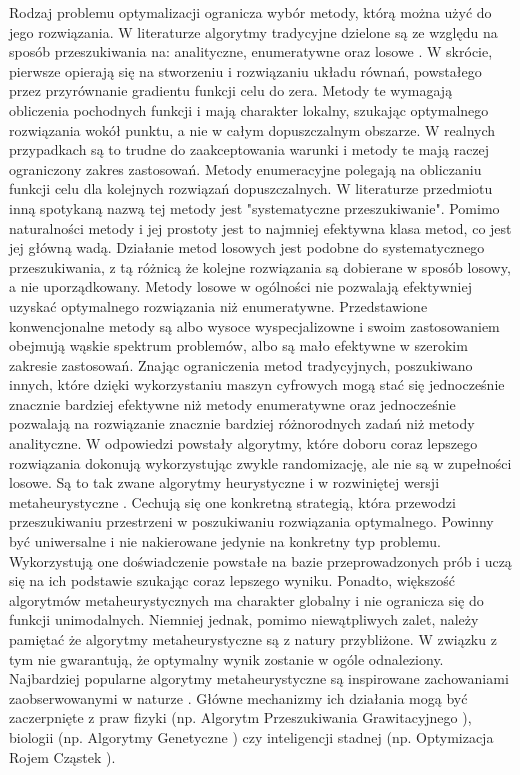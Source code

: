 Rodzaj problemu optymalizacji ogranicza wybór metody, którą można użyć do jego rozwiązania. W literaturze algorytmy tradycyjne dzielone są ze względu na sposób przeszukiwania na: analityczne, enumeratywne oraz losowe \parencite{Goldberg1995}. W skrócie, pierwsze opierają się na stworzeniu i rozwiązaniu układu równań, powstałego przez przyrównanie gradientu funkcji celu do zera. Metody te wymagają obliczenia pochodnych funkcji i mają charakter lokalny, szukając optymalnego rozwiązania wokół punktu, a nie w całym dopuszczalnym obszarze. W realnych przypadkach są to trudne do zaakceptowania warunki i metody te mają raczej ograniczony zakres zastosowań. Metody enumeracyjne polegają na obliczaniu funkcji celu dla kolejnych rozwiązań dopuszczalnych. W literaturze przedmiotu inną spotykaną nazwą tej metody jest "systematyczne przeszukiwanie". Pomimo naturalności metody i jej prostoty jest to najmniej efektywna klasa metod, co jest jej główną wadą. Działanie metod losowych jest podobne do systematycznego przeszukiwania, z tą różnicą że kolejne rozwiązania są dobierane w sposób losowy, a nie uporządkowany. Metody losowe w ogólności nie pozwalają efektywniej uzyskać optymalnego rozwiązania niż enumeratywne. Przedstawione konwencjonalne metody są albo wysoce wyspecjalizowne i swoim zastosowaniem obejmują wąskie spektrum problemów, albo są mało efektywne w szerokim zakresie zastosowań. Znając ograniczenia metod tradycyjnych, poszukiwano innych, które dzięki wykorzystaniu maszyn cyfrowych mogą stać się jednocześnie znacznie bardziej efektywne niż metody enumeratywne oraz jednocześnie pozwalają na rozwiązanie znacznie bardziej różnorodnych zadań niż metody analityczne. W odpowiedzi powstały algorytmy, które doboru coraz lepszego rozwiązania dokonują wykorzystując zwykle randomizację, ale nie są w zupełności losowe. Są to tak zwane algorytmy heurystyczne i w rozwiniętej wersji metaheurystyczne \parencite{Blum2003}. Cechują się one konkretną strategią, która przewodzi przeszukiwaniu przestrzeni w poszukiwaniu rozwiązania optymalnego. Powinny być uniwersalne i nie nakierowane jedynie na konkretny typ problemu. Wykorzystują one doświadczenie powstałe na bazie przeprowadzonych prób i uczą się na ich podstawie szukając coraz lepszego wyniku. Ponadto, większość algorytmów metaheurystycznych ma charakter globalny i nie ogranicza się do funkcji unimodalnych. Niemniej jednak, pomimo niewątpliwych zalet, należy pamiętać że algorytmy metaheurystyczne są z natury przybliżone. W związku z tym nie gwarantują, że optymalny wynik zostanie w ogóle odnaleziony. Najbardziej popularne algorytmy metaheurystyczne są inspirowane zachowaniami zaobserwowanymi w naturze \parencite{FisterJr.2013}. Główne mechanizmy ich działania mogą być zaczerpnięte z praw fizyki (np. Algorytm Przeszukiwania Grawitacyjnego \parencite{Rashedi2009}), biologii (np. Algorytmy Genetyczne \parencite{Goldberg1995}) czy inteligencji stadnej (np. Optymizacja Rojem Cząstek \parencite{Kennedy1995,Eberhart2001}).
